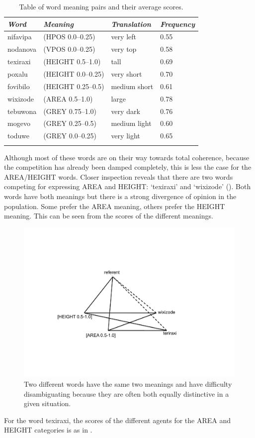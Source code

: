 \begin{table}
\begin{center}
\begin{tabular}{ l  l  l  l }
\lsptoprule
{\itshape Word}&{\itshape Meaning}& {\itshape Translation} & {\itshape Frequency} \\ \midrule
nifavipa & (HPOS 0.0–0.25) & very left & 0.55 \\ 
nodanova & (VPOS 0.0–0.25) & very top & 0.58  \\ 
texiraxi & (HEIGHT 0.5–1.0) & tall & 0.69  \\ 
poxalu & (HEIGHT 0.0–0.25) & very short & 0.70  \\ 
fovibilo & (HEIGHT 0.25–0.5) & medium short & 0.61  \\ 
wixizode & (AREA 0.5–1.0) & large & 0.78  \\ 
tebuwona & (GREY 0.75–1.0) & very dark & 0.76  \\ 
mogevo & (GREY 0.25–0.5) & medium light & 0.60  \\ 
toduwe & (GREY 0.0–0.25) & very light & 0.65  \\ 
\lspbottomrule
\end{tabular}
\caption{\label{tab:freq}Table of word meaning pairs and their average scores.}
\end{center}
\end{table}
Although most of these words are on their way towards
total coherence, because the competition has already 
been damped completely, this is less the case for 
the AREA/HEIGHT words. Closer inspection reveals that 
there are two words competing for expressing
AREA and HEIGHT: `texiraxi' and `wixizode'
(). Both words have both meanings
but there is a strong divergence of opinion in the 
population. Some prefer the AREA meaning, others prefer
the HEIGHT meaning. This can be seen from the scores of 
the different meanings.


\begin{figure}[htbp]
  \centerline{\includegraphics[width=.60\textwidth]{chap6/figs/triangle7.pdf}}
\caption{\label{triangle7}Two different words have the 
same two meanings and have difficulty disambiguating because
they are often both equally distinctive in a given situation.}
\end{figure}
For the word texiraxi, the scores of the different 
agents for the AREA and HEIGHT categories is as in . 


